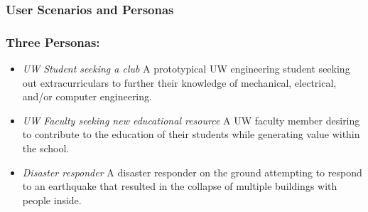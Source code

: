 \documentclass[a4paper, 10pt]{article}
\begin{document}
			
		\subsubsection{User Scenarios and Personas}
		\subsubsection*{Three Personas:}
		\begin{itemize}
			\item
			
			\emph{UW Student seeking a club} A prototypical UW engineering student seeking out extracurriculars to further their knowledge of mechanical, electrical, and/or computer  engineering. 
			
			\item
			\emph{UW Faculty seeking new educational resource} A UW faculty member desiring to contribute to the education of their students while generating value within the school.
			
			\item
			\emph{Disaster responder} A disaster responder on the ground attempting to respond to an earthquake that resulted in the collapse of multiple buildings with people inside.
		\end{itemize}
		
		
\end{document}
